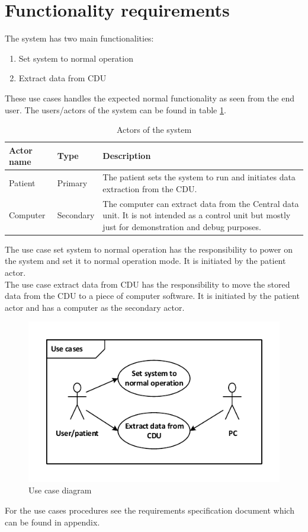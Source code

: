 \section{Functionality requirements}
The system has two main functionalities:
\begin{enumerate}
	\item Set system to normal operation
	\item Extract data from CDU
\end{enumerate}
These use cases handles the expected normal functionality as seen from the end user. The users/actors of the system can be found in table \ref{tab:actors}.
\begin{table}[H]
	\centering
	\begin{tabular}{|l|l|p{9.5cm}|}
	\hline
	Actor name & Type & Description \\ \hline
	Patient & Primary & The patient sets the system to run and initiates data extraction from the CDU. \\ \hline
	Computer & Secondary  & The computer can extract data from the Central data unit. It is not intended as a control unit but mostly just for demonstration and debug purposes.\\ \hline
	\end{tabular}
	\caption{Actors of the system}
	\label{tab:actors}
\end{table}
The use case set system to normal operation has the responsibility to power on the system and set it to normal operation mode. It is initiated by the patient actor.\\
The use case extract data from CDU has the responsibility to move the stored data from the CDU to a piece of computer software. It is initiated by the patient actor and has a computer as the secondary actor. 
\begin{figure}[H]
	\centering
	\includegraphics[width=.7\textwidth]{billeder/7requirementspec/usecase_vector}
	\caption{Use case diagram}
\end{figure}
For the use cases procedures see the requirements specification document which can be found in appendix.
